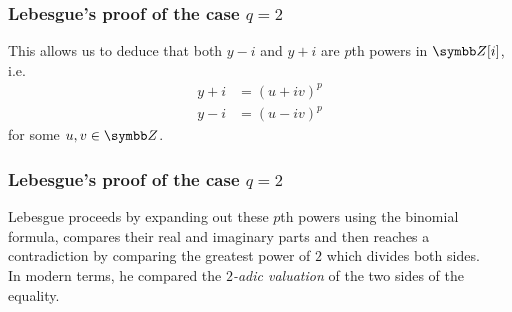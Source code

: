 \begin{frame}
\frametitle{Lebesgue's proof of the case \texorpdfstring{\(q = 2\)}{q = 2}}

This allows us to deduce that both \(y - i\) and \(y + i\) are \(p\)th powers in \(\integers[i]\), i.e.\
\begin{align*}
    y + i &= (u + i v)^p \\
    y - i &= (u - i v)^p
\end{align*}
for some \(u, v \in \integers\). \\[1em]
\end{frame}

\begin{frame}
\frametitle{Lebesgue's proof of the case \texorpdfstring{\(q = 2\)}{q = 2}}

Lebesgue proceeds by expanding out these \(p\)th powers using the binomial formula, compares their real and imaginary parts and then reaches a contradiction by comparing the greatest power of \(2\) which divides both sides. \\[1em]

In modern terms, he compared the \emph{\(2\)-adic valuation} of the two sides of the equality.
\end{frame}
